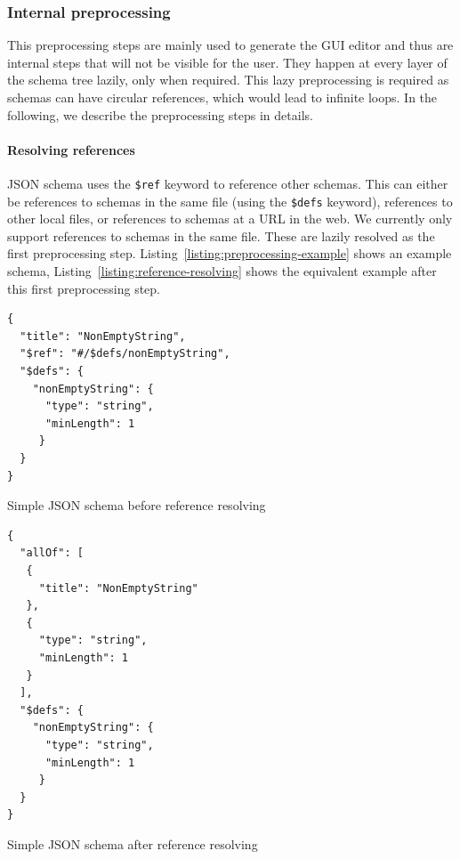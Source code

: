 
\subsubsection{Internal preprocessing}
This preprocessing steps are mainly used to generate the GUI editor and thus are internal steps that will not be visible for the user.
They happen at every layer of the schema tree lazily, only when required.
This lazy preprocessing is required as schemas can have circular references, which would lead to infinite loops.
In the following, we describe the preprocessing steps in details.

\paragraph{Resolving references}
JSON schema uses the \texttt{\$ref} keyword to reference other schemas.
This can either be references to schemas in the same file (using the \texttt{\$defs} keyword), references to other local files,
or references to schemas at a URL in the web.
We currently only support references to schemas in the same file.
These are lazily resolved as the first preprocessing step.
Listing~\ref{listing:preprocessing-example} shows an example schema, Listing~\ref{listing:reference-resolving} shows the equivalent example after
this first preprocessing step.

\begin{listing}[!h]
    \begin{verbatim}
{
  "title": "NonEmptyString",
  "$ref": "#/$defs/nonEmptyString",
  "$defs": {
    "nonEmptyString": {
      "type": "string",
      "minLength": 1
     }
  }
}
    \end{verbatim}
    \caption{Simple JSON schema before reference resolving}
    \label{listing:preprocessing-example}
\end{listing}

\begin{listing}[!h]
    \begin{verbatim}
{
  "allOf": [
   {
     "title": "NonEmptyString"
   },
   {
     "type": "string",
     "minLength": 1
   }
  ],
  "$defs": {
    "nonEmptyString": {
      "type": "string",
      "minLength": 1
     }
  }
}
    \end{verbatim}
    \caption{Simple JSON schema after reference resolving}
    \label{listing:reference-resolving}
\end{listing}

